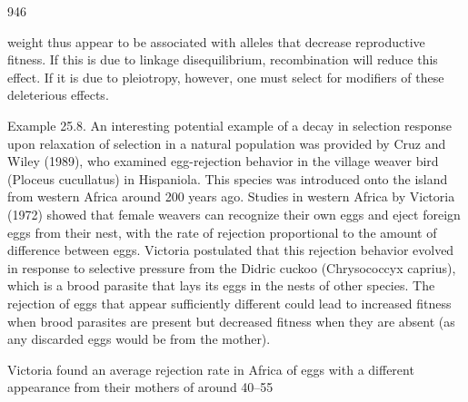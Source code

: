 \documentclass{article}
\begin{document}
946

weight thus appear to be associated with alleles that decrease reproductive fitness. If this is due to linkage disequilibrium, recombination will reduce this effect. If it is due to pleiotropy, however, one must select for modifiers of these deleterious effects.

Example 25.8. An interesting potential example of a decay in selection response upon relaxation of selection in a natural population was provided by Cruz and Wiley (1989), who examined egg-rejection behavior in the village weaver bird (Ploceus cucullatus) in Hispaniola. This species was introduced onto the island from western Africa around 200 years ago. Studies in western Africa by Victoria (1972) showed that female weavers can recognize their own eggs and eject foreign eggs from their nest, with the rate of rejection proportional to the amount of difference between eggs. Victoria postulated that this rejection behavior evolved in response to selective pressure from the Didric cuckoo (Chrysococcyx caprius), which is a brood parasite that lays its eggs in the nests of other species. The rejection of eggs that appear sufficiently different could lead to increased fitness when brood parasites are present but decreased fitness when they are absent (as any discarded eggs would be from the mother).

Victoria found an average rejection rate in Africa of eggs with a different appearance from their mothers of around 40–55%
\end{document}
